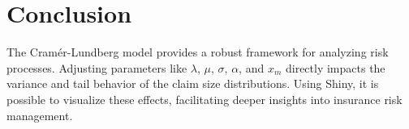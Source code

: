 \documentclass[12pt]{article}
\begin{document}
	\section{Conclusion}
	The Cram\'er-Lundberg model provides a robust framework for analyzing risk processes. Adjusting parameters like $\lambda$, $\mu$, $\sigma$, $\alpha$, and $x_m$ directly impacts the variance and tail behavior of the claim size distributions. Using Shiny, it is possible to visualize these effects, facilitating deeper insights into insurance risk management.
	
	
	
\end{document}
